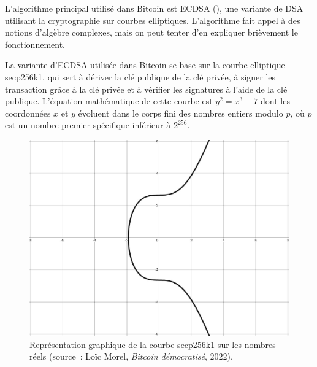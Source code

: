 L'algorithme principal utilisé dans Bitcoin est ECDSA (), une variante de DSA utilisant la cryptographie sur courbes elliptiques. L'algorithme fait appel à des notions d'algèbre complexes, mais on peut tenter d'en expliquer brièvement le fonctionnement.

La variante d'ECDSA utilisée dans Bitcoin se base sur la courbe elliptique secp256k1, qui sert à dériver la clé publique de la clé privée, à signer les transaction grâce à la clé privée et à vérifier les signatures à l'aide de la clé publique. L'équation mathématique de cette courbe est $y^2 = x^3 + 7$ dont les coordonnées $x$ et $y$ évoluent dans le corps fini des nombres entiers modulo $p$, où $p$ est un nombre premier spécifique inférieur à $2^{256}$.

\begin{figure}[h]
  \centering
  \includegraphics[scale=0.4]{img/secp256k1-curve.png}
  \caption{Représentation graphique de la courbe secp256k1 sur les nombres réels (source~: Loïc Morel, \emph{Bitcoin démocratisé}, 2022).}
  \label{fig:secp256k1}
\end{figure}

